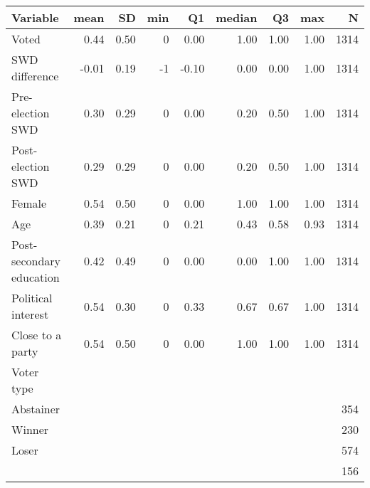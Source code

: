 
\begin{tabular}{l|r|r|r|r|r|r|r|r}
\hline
Variable & mean & SD & min & Q1 & median & Q3 & max & N\\
\hline
Voted & 0.44 & 0.50 & 0 & 0.00 & 1.00 & 1.00 & 1.00 & 1314\\
\hline
SWD difference & -0.01 & 0.19 & -1 & -0.10 & 0.00 & 0.00 & 1.00 & 1314\\
\hline
Pre-election SWD & 0.30 & 0.29 & 0 & 0.00 & 0.20 & 0.50 & 1.00 & 1314\\
\hline
Post-election SWD & 0.29 & 0.29 & 0 & 0.00 & 0.20 & 0.50 & 1.00 & 1314\\
\hline
Female & 0.54 & 0.50 & 0 & 0.00 & 1.00 & 1.00 & 1.00 & 1314\\
\hline
Age & 0.39 & 0.21 & 0 & 0.21 & 0.43 & 0.58 & 0.93 & 1314\\
\hline
Post-secondary education & 0.42 & 0.49 & 0 & 0.00 & 0.00 & 1.00 & 1.00 & 1314\\
\hline
Political interest & 0.54 & 0.30 & 0 & 0.33 & 0.67 & 0.67 & 1.00 & 1314\\
\hline
Close to a party & 0.54 & 0.50 & 0 & 0.00 & 1.00 & 1.00 & 1.00 & 1314\\
\hline
Voter type &  &  &  &  &  &  &  & \\
\hline
Abstainer &  &  &  &  &  &  &  & 354\\
\hline
Winner &  &  &  &  &  &  &  & 230\\
\hline
Loser &  &  &  &  &  &  &  & 574\\
\hline
 &  &  &  &  &  &  &  & 156\\
\hline
\end{tabular}

